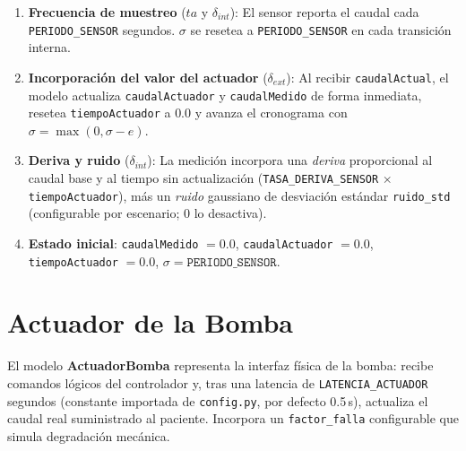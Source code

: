 \documentclass[12pt, a4paper]{article}
\begin{document}
\begin{enumerate}
    \item \textbf{Frecuencia de muestreo} ($\mathit{ta}$ y $\delta_{\mathit{int}}$):
    El sensor reporta el caudal cada \texttt{PERIODO\_SENSOR} segundos.
    $\sigma$ se resetea a \texttt{PERIODO\_SENSOR} en cada transición interna.

    \item \textbf{Incorporación del valor del actuador} ($\delta_{\mathit{ext}}$):
    Al recibir \texttt{caudalActual}, el modelo actualiza \texttt{caudalActuador}
    y \texttt{caudalMedido} de forma inmediata, resetea \texttt{tiempoActuador} a
    $0.0$ y avanza el cronograma con $\sigma = \max(0, \sigma - e)$.

    \item \textbf{Deriva y ruido} ($\delta_{\mathit{int}}$):
    La medición incorpora una \emph{deriva} proporcional al caudal base y al tiempo
    sin actualización (\texttt{TASA\_DERIVA\_SENSOR} $\times$ \texttt{tiempoActuador}),
    más un \emph{ruido} gaussiano de desviación estándar \texttt{ruido\_std}
    (configurable por escenario; $0$ lo desactiva).

    \item \textbf{Estado inicial}: \texttt{caudalMedido} $= 0.0$,
    \texttt{caudalActuador} $= 0.0$, \texttt{tiempoActuador} $= 0.0$,
    $\sigma = \texttt{PERIODO\_SENSOR}$.
\end{enumerate}

\section{Actuador de la Bomba}

El modelo \textbf{ActuadorBomba} representa la interfaz física de la bomba: recibe
comandos lógicos del controlador y, tras una latencia de \texttt{LATENCIA\_ACTUADOR}
segundos (constante importada de \texttt{config.py}, por defecto 0.5\,s), actualiza
el caudal real suministrado al paciente. Incorpora un \texttt{factor\_falla}
configurable que simula degradación mecánica.
\end{document}
